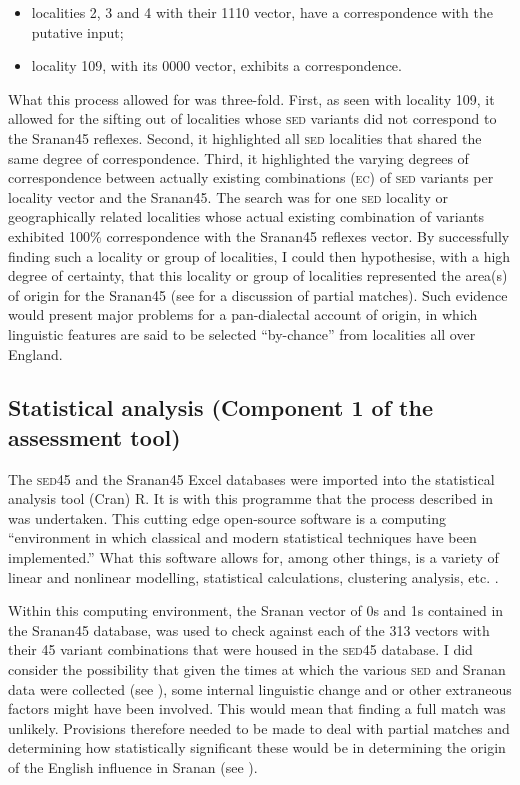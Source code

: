 {{{{{{{{{\begin{itemize}
\item {localities 2, 3 and 4 with their 1110 vector, have a  correspondence with the putative input;}
\item {locality 109, with its 0000 vector, exhibits a  correspondence.} 
\end{itemize}

What this process allowed for was three-fold. First, as seen with locality 109, it allowed for the sifting out of localities whose \textsc{sed} variants did not correspond to the Sranan45 reflexes. Second, it highlighted all \textsc{sed} localities that shared the same degree of correspondence. Third, it highlighted the varying degrees of correspondence between actually existing combinations (\textsc{ec}) of \textsc{sed} variants per locality vector and the Sranan45. The search was for one \textsc{sed} locality or geographically related localities whose actual existing combination of variants exhibited 100\% correspondence with the Sranan45 reflexes vector. By successfully finding such a locality or group of localities, I could then hypothesise, with a high degree of certainty, that this locality or group of localities represented the area(s) of origin for the Sranan45 (see  for a discussion of partial matches). Such evidence would present major problems for a pan-dialectal account of origin, in which linguistic features are said to be selected ``by-chance'' from localities all over England.

\subsection{Statistical analysis (Component 1 of the assessment tool)} \label{3.4.3}
The \textsc{sed45} and the Sranan45 Excel databases were imported into the statistical analysis tool (Cran) R. It is with this programme that the process described in  was undertaken. This cutting edge open-source software is a computing ``environment in which classical and modern statistical techniques have been implemented.'' What this software allows for, among other things, is a variety of linear and nonlinear modelling, statistical calculations, clustering analysis, etc. \citep{R11}.

Within this computing environment, the Sranan vector of 0s and 1s contained in the Sranan45 database, was used to check against each of the 313 vectors with their 45 variant combinations that were housed in the \textsc{sed45} database. I did consider the possibility that given the times at which the various \textsc{sed} and Sranan data were collected (see ), some internal linguistic change and or other extraneous factors might have been involved. This would mean that finding a full match was unlikely. Provisions therefore needed to be made to deal with partial matches and determining how statistically significant these would be in determining the origin of the English influence in Sranan (see ).

}}}}}}}}}
